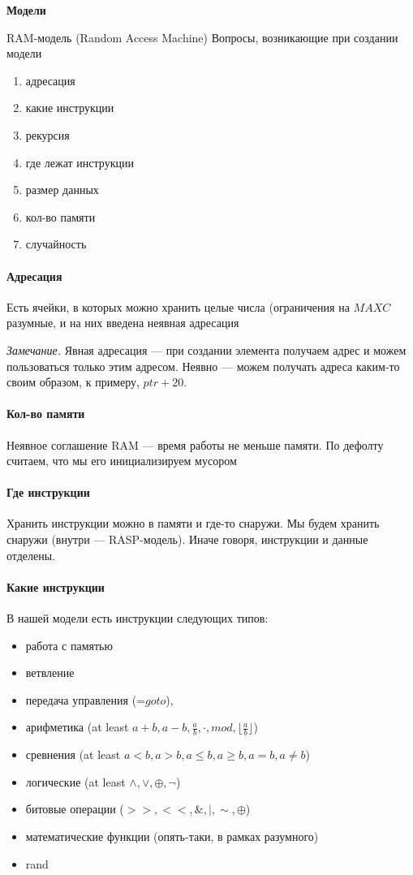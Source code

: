 \documentclass{article}
\begin{document}
\textbf{Модели}

RAM-модель (Random Access Machine)
Вопросы, возникающие при создании модели
\begin{enumerate}
\item адресация 
\item какие инструкции
\item рекурсия
\item где лежат инструкции
\item размер данных 
\item кол-во памяти
\item случайность
\end{enumerate}

\paragraph{Адресация}

Есть ячейки, в которых можно хранить целые числа (ограничения на $MAXC$ разумные, и на них введена неявная адресация

\textit{Замечание.} Явная адресация --- при создании элемента получаем адрес и можем пользоваться только этим адресом. Неявно --- можем получать адреса каким-то своим образом, к примеру, $ptr + 20$.

\paragraph{Кол-во памяти}

Неявное соглашение RAM --- время работы не меньше памяти. По дефолту считаем, что мы его инициализируем мусором

\paragraph{Где инструкции}

Хранить инструкции можно в памяти и где-то снаружи. Мы будем хранить снаружи (внутри --- RASP-модель). Иначе говоря, инструкции и данные отделены. 


\paragraph{Какие инструкции}
В нашей модели есть инструкции следующих типов: 

\begin{itemize}
\item работа с памятью
\item ветвление
\item передача управления (=$goto$), 
\item арифметика (at least $a + b, a - b, \frac{a}{b}, \cdot, mod, \lfloor \frac{a}{b} \rfloor$)
\item сревнения (at least $a < b, a > b, a \le b, a \ge b, a = b, a \neq b$)
\item логические (at least $\land, \lor, \oplus, \lnot$)
\item битовые операции ($>>, <<, \&, |, \sim, \oplus$)
\item математические функции (опять-таки, в рамках разумного)
\item rand
\end{itemize}
\end{document}
